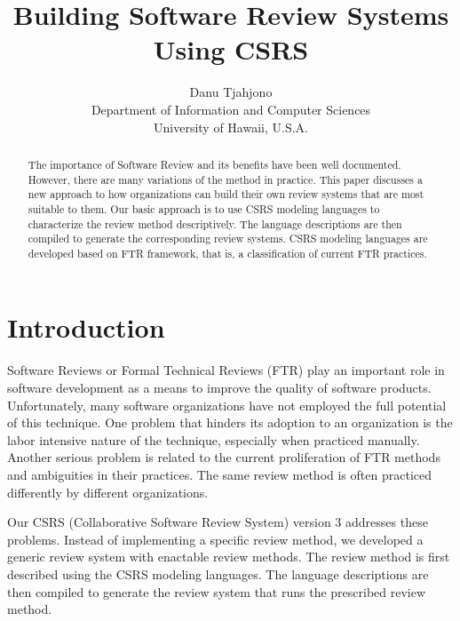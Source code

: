 


\title {Building Software Review Systems\\
 Using CSRS}
\author{ Danu Tjahjono\\
Department of Information and Computer Sciences \\
University of Hawaii, U.S.A.}

\maketitle

\thispagestyle{empty}
\begin{abstract}
The importance of Software Review and its benefits have been well
documented. However, there are many variations of the method in
practice. This paper discusses a new approach to how organizations can 
build their own review systems that are most suitable to them.
Our basic approach is to use CSRS modeling languages
to characterize the review method descriptively. 
The language descriptions are then compiled to generate the
corresponding review systems.
CSRS modeling languages are developed based on FTR framework, that is,
a classification of current FTR practices.
\end{abstract}

\section{Introduction}

Software Reviews or Formal Technical Reviews (FTR) play
an important role in software development as a means to
improve the quality of software products. Unfortunately, many
software organizations have not employed the full potential of
this technique.  One problem that hinders its adoption to an
organization is the labor intensive nature of the technique,
especially when practiced manually. Another serious problem is related
to  the current proliferation of FTR methods and ambiguities in their 
practices. The same review method is often practiced differently by
different organizations. 

Our CSRS (Collaborative Software Review System) version 3 addresses
these problems. Instead of implementing a specific review 
method, we developed a generic review system with enactable review
methods. The review method is first described using the CSRS modeling 
languages. The language descriptions are then compiled to generate the
review system that runs the prescribed review method. 

